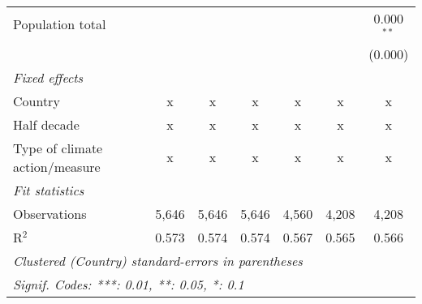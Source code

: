 \begin{tabular}{lcccccc}
   Population total                                           &               &               &                &                &                & 0.000$^{**}$\\   
                                                              &               &               &                &                &                & (0.000)\\   
   \emph{Fixed effects}\\
   Country                                                    & x             & x             & x              & x              & x              & x\\  
   Half decade                                                & x             & x             & x              & x              & x              & x\\  
   Type of climate action/measure                             & x             & x             & x              & x              & x              & x\\  
   \midrule \emph{Fit statistics}\\
   Observations                                               & 5,646         & 5,646         & 5,646          & 4,560          & 4,208          & 4,208\\  
   R$^2$                                                      & 0.573         & 0.574         & 0.574          & 0.567          & 0.565          & 0.566\\  
   \midrule
   \multicolumn{7}{l}{\emph{Clustered (Country) standard-errors in parentheses}}\\
   \multicolumn{7}{l}{\emph{Signif. Codes: ***: 0.01, **: 0.05, *: 0.1}}\\
\end{tabular}
\par\endgroup


